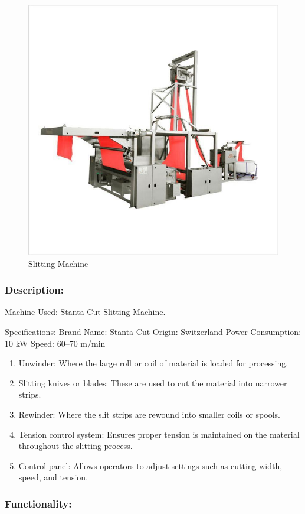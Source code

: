 \begin{figure}[h!]
  \centering
  \includegraphics[width=0.8\linewidth]{figs/production/image2.jpg}
  \caption{Slitting Machine}
  \label{fig:Slitting Machine}
\end{figure}


\subsubsection{Description:}

Machine Used: Stanta Cut Slitting Machine.

Specifications:
Brand Name: Stanta Cut
Origin: Switzerland
Power Consumption: 10 kW
Speed: 60–70 m/min


\begin{enumerate}
\item
  Unwinder: Where the large roll or coil of material is loaded for
  processing.
\item
  Slitting knives or blades: These are used to cut the material into
  narrower strips.
\item
  Rewinder: Where the slit strips are rewound into smaller coils or
  spools.
\item
  Tension control system: Ensures proper tension is maintained on the
  material throughout the slitting process.
\item
  Control panel: Allows operators to adjust settings such as cutting
  width, speed, and tension.
\end{enumerate}

\subsubsection{Functionality:}

